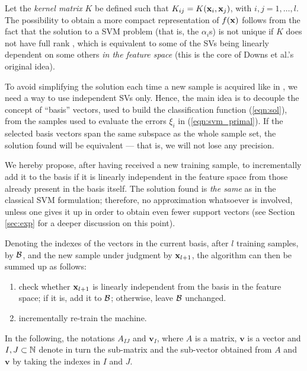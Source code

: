 Let the \emph{kernel matrix} $K$ be defined such that $K_{ij} =
K(\mathbf{x}_i,\mathbf{x}_j)$, with $i,j=1,\ldots,l$. The possibility to obtain a more
compact representation of $f(\mathbf{x})$ follows from the fact that the
solution to a SVM problem (that is, the $\alpha_i$s) is not unique if
$K$ does not have full rank \cite{Burges98}, which is equivalent to
some of the SVs being linearly dependent on some others \emph{in the
feature space} (this is the core of Downs et al.'s \cite{DownsGM01}
original idea).

To avoid simplifying the solution each time a new sample is acquired
like in \cite{DownsGM01}, we need a way to use independent SVs
only. Hence, the main idea is to decouple the concept of ``basis''
vectors, used to build the classification function (\ref{eqn:sol}),
from the samples used to evaluate the errors $\xi_i$ in (\ref{eqn:svm_primal}). If the selected
basis vectors span the same subspace as the whole sample set, the
solution found will be equivalent --- that is, we will not lose any
precision.

We hereby propose, after having received a new training sample, to
incrementally add it to the basis if it is linearly independent in the
feature space from those already present in the basis itself. The
solution found is \emph{the same} as in the classical SVM formulation;
therefore, no approximation whatsoever is involved, unless one gives
it up in order to obtain even fewer support vectors (see Section
\ref{sec:exp} for a deeper discussion on this point).

Denoting the indexes of the vectors in the current basis, after $l$
training samples, by $\mathcal{B}$, and the new sample under judgment by
$\mathbf{x}_{l+1}$, the algorithm can then be summed up as follows:

\begin{enumerate}

  \item check whether $\mathbf{x}_{l+1}$ is linearly independent from the
        basis in the feature space; if it is, add it to $\mathcal{B}$;
        otherwise, leave $\mathcal{B}$ unchanged.

  \item incrementally re-train the machine.

\end{enumerate}

In the following, the notations $A_{IJ}$ and $\mathbf{v}_I$, where $A$
is a matrix, $\mathbf{v}$ is a vector and $I,J \subset \mathbb{N}$ denote in
turn the sub-matrix and the sub-vector obtained from $A$ and
$\mathbf{v}$ by taking the indexes in $I$ and $J$.

